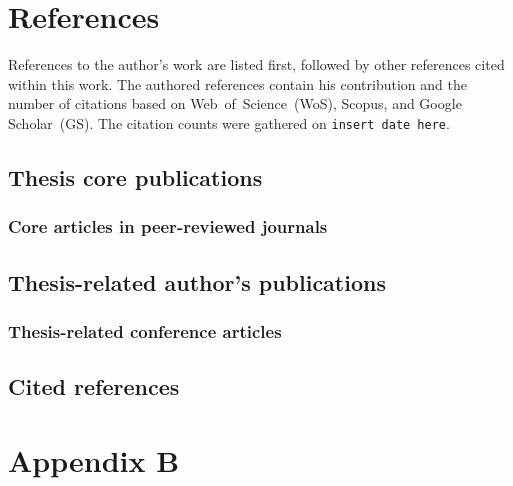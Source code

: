 
\appendix
\renewcommand\chaptername{Appendix}

\chapter{References}

References to the author's work are listed first, followed by other references cited within this work.
The authored references contain his contribution and the number of citations based on Web~of~Science~(WoS), Scopus, and Google Scholar~(GS).
The citation counts were gathered on {\color{red} \texttt{insert date here}}.

\section{Thesis core publications}

\subsection*{Core articles in peer-reviewed journals}

\printbibliography[keyword={mine},keyword={phd_related},keyword={journal},keyword={core},notkeyword={submitted},heading=none,title={}]

\section{Thesis-related author's publications}

\subsection*{Thesis-related conference articles}

\printbibliography[keyword={mine},keyword={phd_related},keyword={conference},notkeyword={core},notkeyword={submitted},heading=none,title={}]

\section{Cited references}

\printbibliography[notkeyword=mine,heading=none,title={}]

\renewcommand{\thechapter}{B}
\renewcommand\chaptername{Appendix B}

\chapter{Appendix B}


